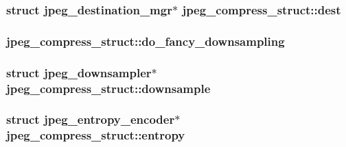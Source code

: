 \subsubsection[{dest}]{\setlength{\rightskip}{0pt plus 5cm}struct {\bf jpeg\+\_\+destination\+\_\+mgr}$\ast$ jpeg\+\_\+compress\+\_\+struct\+::dest}\label{structjpeg__compress__struct_ab31c2c756e309dee8d0318557353ba40}
\hypertarget{structjpeg__compress__struct_a683db079af3beb44eaab5b421a5a9d4f}{}
\subsubsection[{do\+\_\+fancy\+\_\+downsampling}]{ jpeg\+\_\+compress\+\_\+struct\+::do\+\_\+fancy\+\_\+downsampling}\label{structjpeg__compress__struct_a683db079af3beb44eaab5b421a5a9d4f}
\hypertarget{structjpeg__compress__struct_a65a72b804640a0c339863f6562098113}{}
\subsubsection[{downsample}]{\setlength{\rightskip}{0pt plus 5cm}struct {\bf jpeg\+\_\+downsampler}$\ast$ jpeg\+\_\+compress\+\_\+struct\+::downsample}\label{structjpeg__compress__struct_a65a72b804640a0c339863f6562098113}
\hypertarget{structjpeg__compress__struct_a30477f9e5f6be16823e1aff2762ae270}{}
\subsubsection[{entropy}]{\setlength{\rightskip}{0pt plus 5cm}struct {\bf jpeg\+\_\+entropy\+\_\+encoder}$\ast$ jpeg\+\_\+compress\+\_\+struct\+::entropy}\label{structjpeg__compress__struct_a30477f9e5f6be16823e1aff2762ae270}
\hypertarget{structjpeg__compress__struct_ac113c777486860f0b2f3784345073a83}{}

